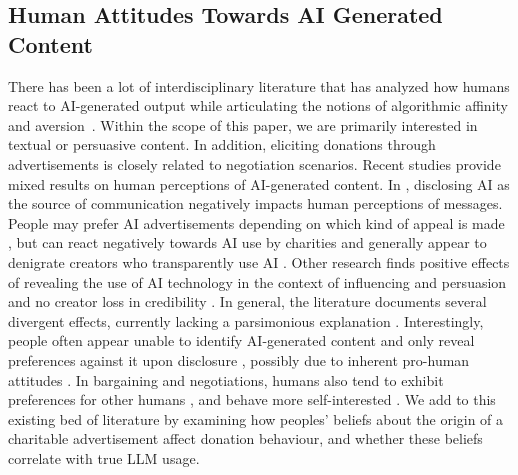 \subsection{Human Attitudes Towards AI Generated Content} There has been a lot of 
interdisciplinary literature that has analyzed how humans react to AI-generated output while articulating the notions of algorithmic affinity and aversion~\cite{dietvorst2015algorithm,dietvorst2018overcoming}. Within the scope of this paper, we are primarily interested in textual or persuasive content. In addition, eliciting donations through advertisements is closely related to negotiation scenarios. Recent studies provide mixed results on human perceptions of AI-generated content. In \citet{lim2024effect}, disclosing AI as the source of communication negatively impacts human perceptions of messages. People may prefer AI advertisements depending on which kind of appeal is made \cite{chen2024consumer}, but can react negatively towards AI use by charities \cite{arango2023consumer} and generally appear to denigrate creators who transparently use AI \cite{rae2024effects,bruns2024you}. Other research finds positive effects of revealing the use of AI technology in the context of influencing and persuasion \cite{wang2024positive} and no creator loss in credibility \cite{huschens2023you}. In general, the literature documents several divergent effects, currently lacking a parsimonious explanation \cite{ferraro2024paradoxes}. Interestingly, people often appear unable to identify AI-generated content \cite{clark2021all} and only reveal preferences against it upon disclosure \cite{kobis2021artificial}, possibly due to inherent pro-human attitudes \cite{grassini2024understanding,zhang2023human}. In bargaining and negotiations, humans also tend to exhibit preferences for other humans \cite{erlei2022s}, and behave more self-interested \cite{erlei2020impact,shen2024bargaining,chugunova2022we,von2023social}. We add to this existing bed of literature by examining how peoples' beliefs about the origin of a charitable advertisement affect donation behaviour, and whether these beliefs correlate with true LLM usage.
